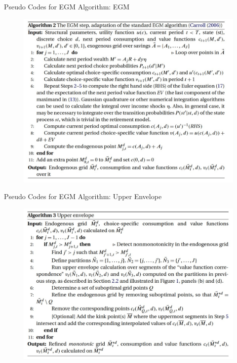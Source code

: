\documentclass[aspectratio=169]{beamer}
\begin{document}
\begin{frame}{Pseudo Codes for EGM Algorithm: EGM}
	\begin{figure}
		\includegraphics[scale=0.5]{algorithm2.jpg}
	\end{figure}
\end{frame}

\begin{frame}{Pseudo Codes for EGM Algorithm: Upper Envelope}
	\label{algo:upperenvelope}
	\begin{figure}
		\includegraphics[scale=0.55]{algorithm3.jpg}
	\end{figure}
	\hyperlink{fig:upperenvelope}{}
\end{frame}
\end{document}
